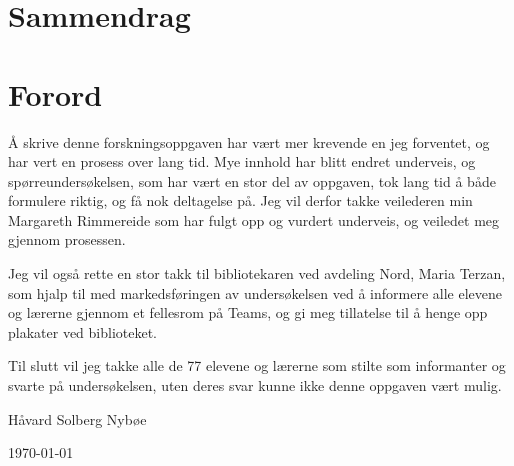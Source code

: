 \section*{Sammendrag}


\section*{Forord}
Å skrive denne forskningsoppgaven har vært mer krevende en jeg forventet, og har vert en prosess over lang tid. Mye innhold har blitt endret underveis, og spørreundersøkelsen, som har vært en stor del av oppgaven, tok lang tid å både formulere riktig, og få nok deltagelse på. Jeg vil derfor takke veilederen min Margareth Rimmereide som har fulgt opp og vurdert underveis, og veiledet meg gjennom prosessen. 

Jeg vil også rette en stor takk til bibliotekaren ved avdeling Nord, Maria Terzan, som hjalp til med markedsføringen av undersøkelsen ved å informere alle elevene og lærerne gjennom et fellesrom på Teams, og gi meg tillatelse til å henge opp plakater ved biblioteket.

Til slutt vil jeg takke alle de 77 elevene og lærerne som stilte som informanter og svarte på undersøkelsen, uten deres svar kunne ikke denne oppgaven vært mulig.

\vfill

Håvard Solberg Nybøe

\today{}


\newpage